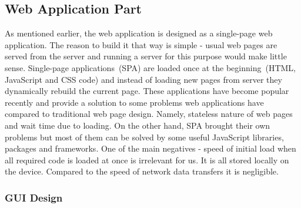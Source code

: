 \subsection{Web Application Part}

As mentioned earlier, the web application is designed as a single-page web application. The reason to build it that way is simple - usual web pages are served from the server and running a server for this purpose would make little sense. Single-page applications~(SPA) are loaded once at the beginning~(HTML, JavaScript and CSS code) and instead of loading new pages from server they dynamically rebuild the current page. These applications have become popular recently and provide a solution to some problems web applications have compared to traditional web page design. Namely, stateless nature of web pages and wait time due to loading. On the other hand, SPA brought their own problems but most of them can be solved by some useful JavaScript libraries, packages and frameworks. One of the main negatives - speed of initial load when all required code is loaded at once is irrelevant for us. It is all stored locally on the device. Compared to the speed of network data transfers it is negligible.

\subsubsection{GUI Design}

